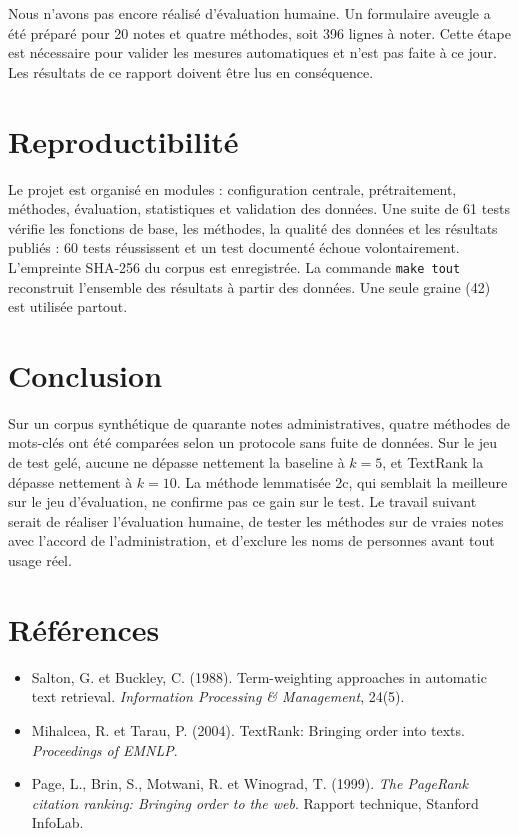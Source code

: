 \documentclass[11pt,a4paper]{article}
\begin{document}
Nous n'avons pas encore réalisé d'évaluation humaine. Un formulaire aveugle a été préparé pour 20 notes et quatre méthodes, soit 396 lignes à noter. Cette étape est nécessaire pour valider les mesures automatiques et n'est pas faite à ce jour. Les résultats de ce rapport doivent être lus en conséquence.

\section{Reproductibilité}

Le projet est organisé en modules : configuration centrale, prétraitement, méthodes, évaluation, statistiques et validation des données. Une suite de 61 tests vérifie les fonctions de base, les méthodes, la qualité des données et les résultats publiés : 60 tests réussissent et un test documenté échoue volontairement. L'empreinte SHA-256 du corpus est enregistrée. La commande \texttt{make tout} reconstruit l'ensemble des résultats à partir des données. Une seule graine (42) est utilisée partout.

\section{Conclusion}

Sur un corpus synthétique de quarante notes administratives, quatre méthodes de mots-clés ont été comparées selon un protocole sans fuite de données. Sur le jeu de test gelé, aucune ne dépasse nettement la baseline à $k=5$, et TextRank la dépasse nettement à $k=10$. La méthode lemmatisée 2c, qui semblait la meilleure sur le jeu d'évaluation, ne confirme pas ce gain sur le test. Le travail suivant serait de réaliser l'évaluation humaine, de tester les méthodes sur de vraies notes avec l'accord de l'administration, et d'exclure les noms de personnes avant tout usage réel.

\section*{Références}

\begin{itemize}[leftmargin=*,itemsep=2pt]
\item Salton, G. et Buckley, C. (1988). Term-weighting approaches in automatic text retrieval. \emph{Information Processing \& Management}, 24(5).
\item Mihalcea, R. et Tarau, P. (2004). TextRank: Bringing order into texts. \emph{Proceedings of EMNLP}.
\item Page, L., Brin, S., Motwani, R. et Winograd, T. (1999). \emph{The PageRank citation ranking: Bringing order to the web}. Rapport technique, Stanford InfoLab.
\end{itemize}
\end{document}

